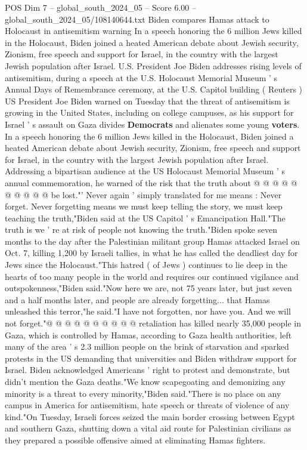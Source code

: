 \begin{textsample}{POS Dim 7 – global\_south\_2024\_05 – Score 6.00 – global\_south\_2024\_05/108140644.txt}  \label{ex:f7_pos_214}
Biden compares Hamas attack to Holocaust in antisemitism warning In a speech honoring the 6 million Jews killed in the Holocaust, Biden joined a heated American debate about Jewish security, Zionism, free speech and support for Israel, in the country with the largest Jewish population after Israel.
U.S.
President Joe Biden addresses rising levels of antisemitism, during a speech at the U.S.
Holocaust Memorial Museum ' s Annual Days of Remembrance ceremony, at the U.S.
Capitol building ( Reuters ) US President Joe Biden warned on Tuesday that the threat of antisemitism is growing in the United States, including on college campuses, as his support for Israel ' s assault on Gaza divides \textbf{Democrats} and alienates some young \textbf{voters}.
In a speech honoring the 6 million Jews killed in the Holocaust, Biden joined a heated American debate about Jewish security, Zionism, free speech and support for Israel, in the country with the largest Jewish population after Israel.
Addressing a bipartisan audience at the US Holocaust Memorial Museum ' s annual commemoration, he warned of the risk that the truth about @ @ @ @ @ @ @ @ @ @ be lost."' Never again ' simply translated for me means : Never forget.
Never forgetting means we must keep telling the story, we must keep teaching the truth,"Biden said at the US Capitol ' s Emancipation Hall."The truth is we ' re at risk of people not knowing the truth."Biden spoke seven months to the day after the Palestinian militant group Hamas attacked Israel on Oct. 7, killing 1,200 by Israeli tallies, in what he has called the deadliest day for Jews since the Holocaust."This hatred ( of Jews ) continues to lie deep in the hearts of too many people in the world and requires our continued vigilance and outspokenness,"Biden said."Now here we are, not 75 years later, but just seven and a half months later, and people are already forgetting... that Hamas unleashed this terror,"he said."I have not forgotten, nor have you.
And we will not forget."@ @ @ @ @ @ @ @ @ @ retaliation has killed nearly 35,000 people in Gaza, which is controlled by Hamas, according to Gaza health authorities, left many of the area ' s 2.3 million people on the brink of starvation and sparked protests in the US demanding that universities and Biden withdraw support for Israel.
Biden acknowledged Americans ' right to protest and demonstrate, but didn't mention the Gaza deaths."We know scapegoating and demonizing any minority is a threat to every minority,"Biden said."There is no place on any campus in America for antisemitism, hate speech or threats of violence of any kind."On Tuesday, Israeli forces seized the main border crossing between Egypt and southern Gaza, shutting down a vital aid route for Palestinian civilians as they prepared a possible offensive aimed at eliminating Hamas fighters.

\end{textsample}
